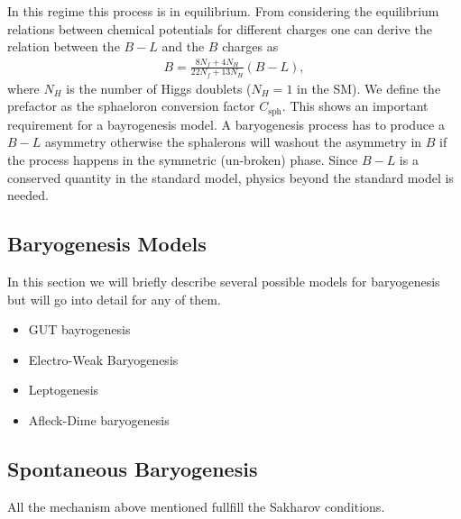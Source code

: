\documentclass[13pt,a4paper,twoside,titlepage]{article}
\begin{document}
\noindent
In this regime this process is in equilibrium. From considering the
equilibrium relations between chemical potentials for different charges one
can derive the relation between the $B - L$ and the $B$ charges as \cite[eq. 22]{Trodden:2004mj_baryogenesis_and_leptogenesis}
\begin{align}
    B = \frac{8 N_f + 4 N_H}{22 N_f + 13 N_H} (B - L),
\end{align}
where $N_H$ is the number of Higgs doublets ($N_H = 1$ in the SM). We define the prefactor as the sphaeloron conversion factor $C_\mathrm{sph}$.
This shows an important requirement for a bayrogenesis model.
A baryogenesis process has to produce a $B - L$ asymmetry otherwise the sphalerons
will washout the asymmetry in $B$ if the process happens in the symmetric (un-broken) phase. Since $B - L$ is a conserved quantity in the standard model, physics beyond the standard model is needed.


\subsection{Baryogenesis Models}
In this section we will briefly describe several possible models for baryogenesis but will go into detail for any of them.

\begin{itemize}
    \item GUT bayrogenesis
    \item Electro-Weak Baryogenesis
    \item Leptogenesis
    \item Afleck-Dime baryogenesis
\end{itemize}





\subsection{Spontaneous Baryogenesis}
\label{sec:spontaneour_bayrogenesis}

All the mechanism above mentioned fullfill the Sakharov conditions.
\end{document}
